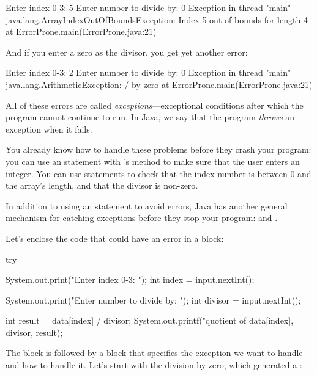 \begin{stdout}
Enter index 0-3: 5
Enter number to divide by: 0
Exception in thread "main"
  java.lang.ArrayIndexOutOfBoundsException:
  Index 5 out of bounds for length 4
	at ErrorProne.main(ErrorProne.java:21)

\end{stdout}

And if you enter a zero as the divisor, you get yet another error:

\begin{stdout}
Enter index 0-3: 2
Enter number to divide by: 0
Exception in thread "main"
  java.lang.ArithmeticException: / by zero
    at ErrorProne.main(ErrorProne.java:21)
\end{stdout}

All of these errors are called {\em exceptions}---exceptional conditions after which the program cannot continue to run. In Java, we say that the program {\em throws} an exception when it fails.

You already know how to handle these problems before they crash your program: you can use an  statement with 's  method to make sure that the user enters an integer. You can use  statements to check that the index number is between 0 and the array's length, and that the divisor is non-zero.

In addition to using an  statement to avoid errors, Java has another general mechanism for catching exceptions before they stop your program:   and .

Let's enclose the code that could have an error in a  block:

\begin{code}
try {
    System.out.print("Enter index 0-3: ");
    int index = input.nextInt();
    
    System.out.print("Enter number to divide by: ");
    int divisor = input.nextInt();
    
    int result = data[index] / divisor;
    System.out.printf("quotient of %
        data[index], divisor, result);
}
\end{code}

The  block is followed by a  block that specifies the exception we want to handle
and how to handle it.  Let's start with the division by zero, which generated a :

